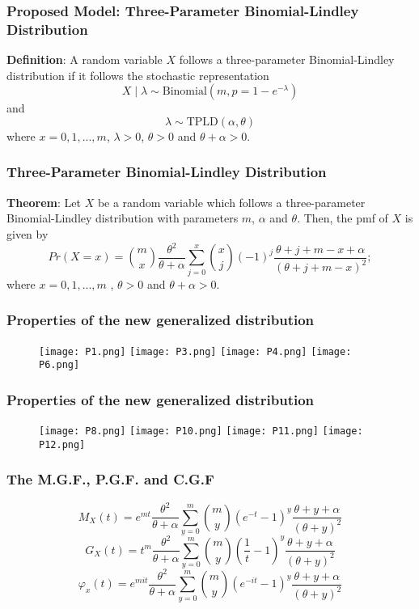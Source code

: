 \documentclass{beamer}
\begin{document}
\begin{frame}
\frametitle {Proposed Model: Three-Parameter Binomial-Lindley Distribution}
\textbf{Definition}: A random variable $X$ follows a three-parameter Binomial-Lindley distribution if it follows the stochastic representation
\[
X\mid \lambda \sim \mbox{Binomial}(m,p=1-e^{-\lambda})
\]
and
\[
\lambda \sim \mbox{TPLD}(\alpha, \theta)
\]
where $x=0,1,...,m$, $\lambda>0$, $\theta>0 $  and  $\theta+\alpha>0$.
\end{frame}

\begin{frame}
\frametitle {Three-Parameter Binomial-Lindley Distribution}
\textbf{Theorem}: Let $X$ be a random variable which follows a three-parameter Binomial-Lindley distribution with parameters $m$, $\alpha$ and $\theta$. Then, the pmf of $X$ is given by
\[
Pr(X=x)= {m \choose x} \frac{\theta^2}{\theta+\alpha} \sum_{j=0}^x {x \choose j} (-1)^{j} \frac{\theta+j+m-x+\alpha}{(\theta+j+m-x)^2};
\]
where $x=0, 1, ..., m$ , $\theta>0$ and $\theta+\alpha>0$.
\end{frame}

\begin{frame}
\frametitle{Properties of the new generalized distribution}
\begin{figure}[ht]
\begin{center}
\texttt{[image: P1.png]}
\texttt{[image: P3.png]}
\texttt{[image: P4.png]}
\texttt{[image: P6.png]}
\end{center}
\end{figure}
\end{frame}

\begin{frame}
\frametitle{Properties of the new generalized distribution}
\begin{figure}[ht]
\begin{center}
\texttt{[image: P8.png]}
\texttt{[image: P10.png]}
\texttt{[image: P11.png]}
\texttt{[image: P12.png]}
\end{center}
\end{figure}
\end{frame}

\begin{frame}\footnotesize
\frametitle{The M.G.F., P.G.F. and C.G.F}
\[
M_{X}(t)= e^{mt} \frac{\theta^2}{\theta+\alpha} \sum_{y=0}^m {m \choose y} \left( e^{-t}-1 \right)^y \frac{\theta+y+\alpha}{(\theta+y)^2}
\]
\[
G_{X}(t)= t^m \frac{\theta^2}{\theta+\alpha} \sum_{y=0}^m {m \choose y} \left( \frac{1}{t}-1 \right)^y \frac{\theta+y+\alpha}{(\theta+y)^2}
\]
\[
\varphi_{x}(t)=e^{mit} \frac{\theta^2}{\theta+\alpha} \sum_{y=0}^m {m \choose y} \left( e^{-it}-1 \right)^y \frac{\theta+y+\alpha}{(\theta+y)^2}
\]
\end{frame}
\end{document}
